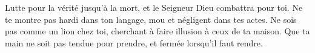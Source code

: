 Lutte pour la vérité jusqu’à la mort, et le Seigneur Dieu combattra pour toi.
Ne te montre pas hardi dans ton langage,
	mou et négligent dans tes actes.
Ne sois pas comme un lion chez toi,
	cherchant à faire illusion à ceux de ta maison.
Que ta main ne soit pas tendue pour prendre, et fermée lorsqu’il faut rendre.
